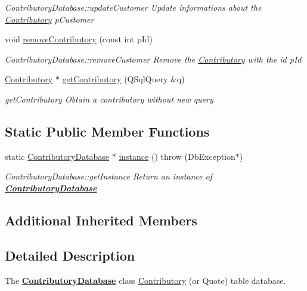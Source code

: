 \begin{DoxyCompactItemize}
\begin{DoxyCompactList}\small\item\em Contributory\+Database\+::update\+Customer Update informations about the \hyperlink{classContributory}{Contributory} {\itshape p\+Customer} \end{DoxyCompactList}\item 
void \hyperlink{classContributoryDatabase_afe934900e66553cb58e49ebf03a7d7a4}{remove\+Contributory} (const int p\+Id)
\begin{DoxyCompactList}\small\item\em Contributory\+Database\+::remove\+Customer Remove the \hyperlink{classContributory}{Contributory} with the id {\itshape p\+Id} \end{DoxyCompactList}\item 
\hyperlink{classContributory}{Contributory} $\ast$ \hyperlink{classContributoryDatabase_ac7d3802f3b5d6598226be3348fc02130}{get\+Contributory} (Q\+Sql\+Query \&q)
\begin{DoxyCompactList}\small\item\em get\+Contributory Obtain a contributory without new query \end{DoxyCompactList}\end{DoxyCompactItemize}
\subsection*{Static Public Member Functions}
\begin{DoxyCompactItemize}
\item 
static \hyperlink{classContributoryDatabase}{Contributory\+Database} $\ast$ \hyperlink{classContributoryDatabase_ac58610f75d4f51fa12c3e08cab1e4404}{instance} ()  throw (\+Db\+Exception$\ast$)
\begin{DoxyCompactList}\small\item\em Contributory\+Database\+::get\+Instance Return an instance of {\bfseries \hyperlink{classContributoryDatabase}{Contributory\+Database}} \end{DoxyCompactList}\end{DoxyCompactItemize}
\subsection*{Additional Inherited Members}


\subsection{Detailed Description}
The {\bfseries \hyperlink{classContributoryDatabase}{Contributory\+Database}} class \hyperlink{classContributory}{Contributory} (or Quote) table database. 

